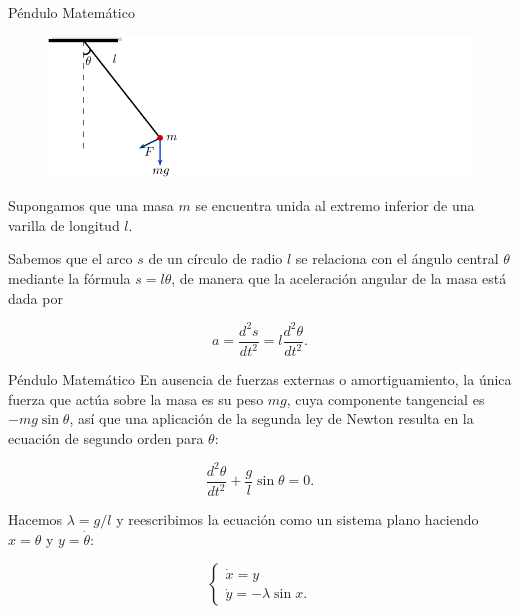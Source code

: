 \documentclass{beamer}
\begin{document}
\begin{frame}{Péndulo Matemático}
\begin{figure} \centering
	\includegraphics[scale=0.8]{../figures/pendulum.pdf}
\end{figure}

Supongamos que una masa $m$ se encuentra unida al extremo inferior de una varilla de longitud $l$.

Sabemos que el arco $s$ de un círculo de radio $l$ se relaciona con el ángulo central $\theta$ mediante la fórmula $s = l\theta$, de manera que la aceleración angular de la masa está dada por

$$ a = \dfrac{d^2s}{dt^2} = l \dfrac{d^2\theta}{dt^2}.$$
\end{frame}

\begin{frame}{Péndulo Matemático}
En ausencia de fuerzas externas o amortiguamiento, la única fuerza que actúa sobre la masa es su peso $mg$, cuya componente tangencial es $-mg\sin\theta$, así que una aplicación de la segunda ley de Newton resulta en la ecuación de segundo orden para $\theta$:

$$	\dfrac{d^2\theta}{dt^2} + \frac{g}{l}\sin\theta = 0.$$

Hacemos $\lambda = g/l$ y reescribimos la ecuación como un sistema plano haciendo $x = \theta$ y $y = \dot{\theta}$:

$$
\left\{	\begin{array}{l}
		\dot{x} = y \\
		\dot{y} = -\lambda \sin x.
	\end{array} \right.
$$
\end{frame}
\end{document}
